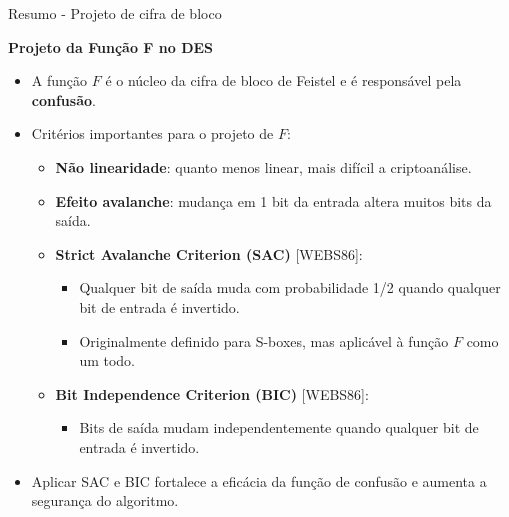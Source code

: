 \begin{frame}{Resumo - Projeto de cifra de bloco}

    \textbf{Projeto da Função F no DES}
    \begin{itemize}
        \item A função $F$ é o núcleo da cifra de bloco de Feistel e é responsável pela \textbf{confusão}.
        \item Critérios importantes para o projeto de $F$:
              \begin{itemize}
                  \item \textbf{Não linearidade}: quanto menos linear, mais difícil a criptoanálise.
                  \item \textbf{Efeito avalanche}: mudança em 1 bit da entrada altera muitos bits da saída.
                  \item \textbf{Strict Avalanche Criterion (SAC)} [WEBS86]:
                        \begin{itemize}
                            \item Qualquer bit de saída muda com probabilidade 1/2 quando qualquer bit de entrada é invertido.
                            \item Originalmente definido para S-boxes, mas aplicável à função $F$ como um todo.
                        \end{itemize}
                  \item \textbf{Bit Independence Criterion (BIC)} [WEBS86]:
                        \begin{itemize}
                            \item Bits de saída mudam independentemente quando qualquer bit de entrada é invertido.
                        \end{itemize}
              \end{itemize}
        \item Aplicar SAC e BIC fortalece a eficácia da função de confusão e aumenta a segurança do algoritmo.
    \end{itemize}
\end{frame}


